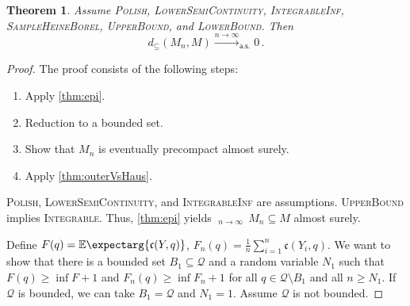 \documentclass{scrartcl}
\renewcommand{\subset}{\subseteq}
\newcommand{\Ex}{\E\expectarg}
\newcommand*{\mc}[1]{\mathcal{#1}}
\newcommand*{\ms}[1]{\mathsf{#1}}
\newcommand*{\mf}[1]{\mathfrak{#1}}
\newcommand{\equationFullstop}{\, .}
\newcommand{\eqfs}{\equationFullstop}
\DeclareMathOperator*{\outerlim}{lim\, \overline{sup}}
\theoremstyle{plain}\newtheorem{theorem}{Theorem}[section]
\theoremstyle{definition}
\theoremstyle{remark}
\begin{document}
\begin{theorem}\label{thm:consistency}
	Assume \textsc{Polish}, \textsc{LowerSemiContinuity}, \textsc{IntegrableInf},  \textsc{SampleHeineBorel}, \textsc{UpperBound}, and \textsc{LowerBound}. Then
	\begin{equation*}
		d_\subset(M_n, M) \xrightarrow{n\to\infty}_{\ms{a.s.}} 0
		\eqfs
	\end{equation*}
\end{theorem}
\begin{proof}
The proof consists of the following steps:
\begin{enumerate}
\item Apply \autoref{thm:epi}.
\item Reduction to a bounded set.
\item Show that $M_n$ is eventually precompact almost surely.
\item Apply \autoref{thm:outerVsHaus}.
\end{enumerate}
\noindent
\underline{}
\textsc{Polish}, \textsc{LowerSemiContinuity}, and \textsc{IntegrableInf} are assumptions. \textsc{UpperBound} implies \textsc{Integrable}. Thus, \autoref{thm:epi} yields $\outerlim_{n\to\infty}\, M_n \subset M$ almost surely.

\noindent
\underline{}
Define $F(q) = \Ex{\mf c(Y, q)}$, $F_n(q) = \frac1n\sum_{i=1}^n \mf c(Y_i, q)$.
We want to show that there is a bounded set $B_1 \subset \mc Q$ and a random variable $N_1$ such that $F(q) \geq \inf F + 1$ and $F_n(q) \geq \inf F_n + 1$ for all $q\in \mc Q \setminus B_1$ and all $n \geq N_1$. If $\mc Q$ is bounded, we can take $B_1 = \mc Q$ and $N_1 = 1$. Assume $\mc Q$ is not bounded.


\end{proof}
\end{document}
